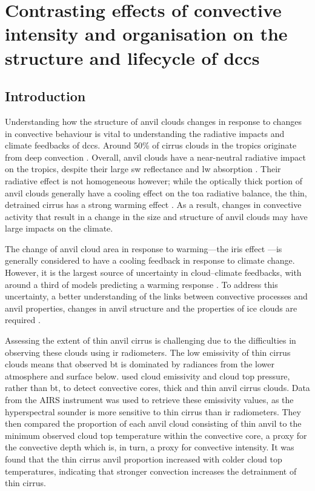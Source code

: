 \chapter{Contrasting effects of convective intensity and organisation on the structure and lifecycle of \acrshort{dcc}s} \label{chp:anvil_structure}

\section{Introduction}

Understanding how the structure of anvil clouds changes in response to changes in convective behaviour is vital to understanding the radiative impacts and climate feedbacks of \acrshort{dcc}s.
Around 50\% of cirrus clouds in the tropics originate from deep convection \citep{massie_distribution_2002, luo_characterizing_2004}.
Overall, anvil clouds have a near-neutral radiative impact on the tropics, despite their large \acrshort{sw} reflectance and \acrshort{lw} absorption \citep{hartmann_effect_1992, hartmann_tropical_2016}.
Their radiative effect is not homogeneous however; while the optically thick portion of anvil clouds generally have a cooling effect on the \acrshort{toa} radiative balance, the thin, detrained cirrus has a strong warming effect \citep{berry_cloud_2014}.
As a result, changes in convective activity that result in a change in the size and structure of anvil clouds may have large impacts on the climate.

The change of anvil cloud area in response to warming---the iris effect \citep{lindzen_does_2001, bony_thermodynamic_2016}---is generally considered to have a cooling feedback in response to climate change.
However, it is the largest source of uncertainty in cloud--climate feedbacks, with around a third of models predicting a warming response \citep{sherwood_assessment_2020}.
To address this uncertainty, a better understanding of the links between convective processes and anvil properties, changes in anvil structure and the properties of ice clouds are required \citep{gasparini_opinion_2023}.

Assessing the extent of thin anvil cirrus is challenging due to the difficulties in observing these clouds using \acrshort{ir} radiometers.
The low emissivity of thin cirrus clouds means that observed \acrshort{bt} is dominated by radiances from the lower atmosphere and surface below.
\citet{protopapadaki_upper_2017} used cloud emissivity and cloud top pressure, rather than \acrshort{bt}, to detect convective cores, thick and thin anvil cirrus clouds.
Data from the AIRS instrument was used to retrieve these emissivity values, as the hyperspectral sounder is more sensitive to thin cirrus than \acrshort{ir} radiometers.
They then compared the proportion of each anvil cloud consisting of thin anvil to the minimum observed cloud top temperature within the convective core, a proxy for the convective depth which is, in turn, a proxy for convective intensity.
It was found that the thin cirrus anvil proportion increased with colder cloud top temperatures, indicating that stronger convection increases the detrainment of thin cirrus.

